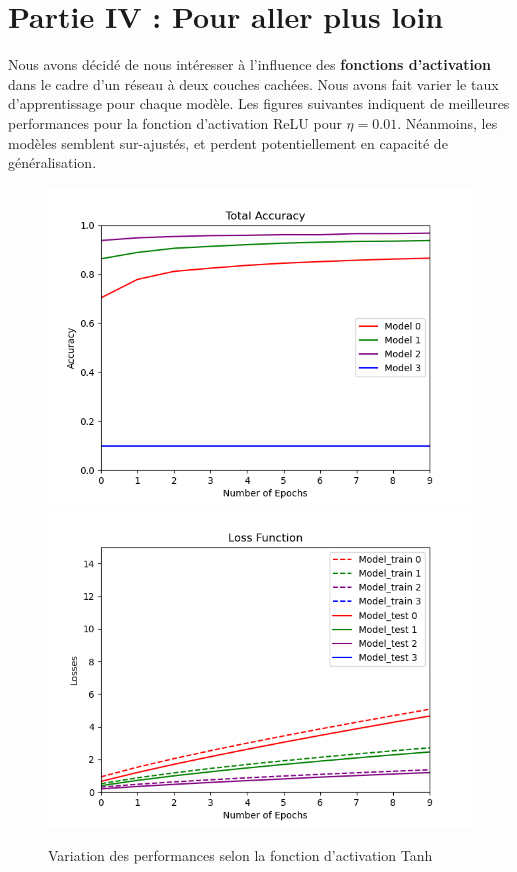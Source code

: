 \documentclass[a4paper]{article}
\begin{document}
	\section*{Partie IV : Pour aller plus loin}
	Nous avons décidé de nous intéresser à l'influence des \textbf{fonctions d'activation} dans le cadre d'un réseau à deux couches cachées. Nous avons fait varier le taux d'apprentissage pour chaque modèle. Les figures suivantes indiquent de meilleures performances pour la fonction d'activation ReLU pour $\eta = 0.01$. Néanmoins, les modèles semblent sur-ajustés, et perdent potentiellement en capacité de généralisation.
	
		\begin{figure}[!ht]
			\centering
			\includegraphics[width=.5\textwidth]{Fig_p4_acc_tanh.png}\hfill
			\includegraphics[width=.5\textwidth]{Fig_p4_losses_tanh.png}\hfill
			\caption{Variation des performances selon la fonction d'activation Tanh}	
		\end{figure}
		
\end{document}
